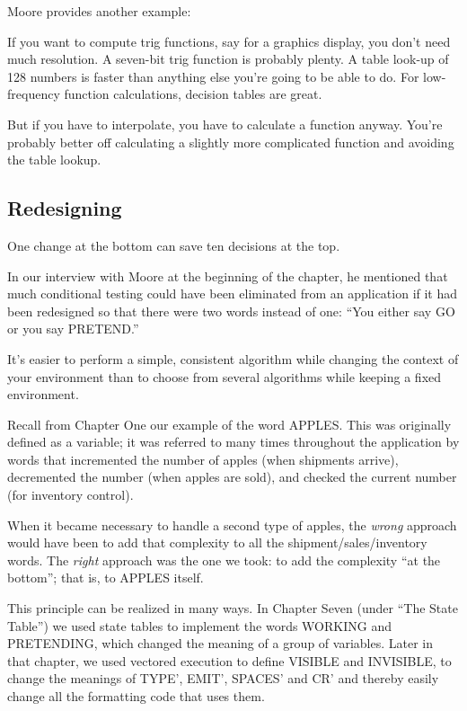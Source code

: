 \bigskip\blackline{2ex}
\noindent Moore provides another example:
\begin{tfquot}
If you want to compute trig functions, say for a graphics display, you don't
need much resolution. A seven-bit trig function is probably plenty. A table
look-up of 128 numbers is faster than anything else you're going to be able
to do. For low-frequency function calculations, decision tables are great.

But if you have to interpolate, you have to calculate a function anyway.
You're probably better off calculating a slightly more complicated function
and avoiding the table lookup.
\end{tfquot}\blackline{1ex}
\subsection{Redesigning}
\begin{tip}
One change at the bottom can save ten decisions at the top.
\end{tip}
In our interview with Moore at the beginning of the chapter, he mentioned
that much conditional testing could have been eliminated from an
application if it had been redesigned so that there were two words instead
of one: ``You either say GO or you say PRETEND.''

It's easier to perform a simple, consistent algorithm while changing
the context of your environment than to choose from several algorithms
while keeping a fixed environment.

Recall from Chapter One our example of the word APPLES. This
was originally defined as a variable; it was referred to many times
throughout the application by words that incremented the number of
apples (when shipments arrive), decremented the number (when apples are
sold), and checked the current number (for inventory control).

When it became necessary to handle a second type of apples, the
\emph{wrong} approach would have been to add that complexity to all the
shipment/sales/inventory words. The \emph{right} approach was the one we
took: to add the complexity ``at the bottom''; that is, to APPLES itself.

This principle can be realized in many ways. In Chapter Seven
(under ``The State Table'') we used state tables to implement the words
WORKING and PRETENDING, which changed the meaning of a group
of variables. Later in that chapter, we used vectored execution to define
VISIBLE and INVISIBLE, to change the meanings of TYPE', EMIT',
SPACES' and CR' and thereby easily change all the formatting code that
uses them.

